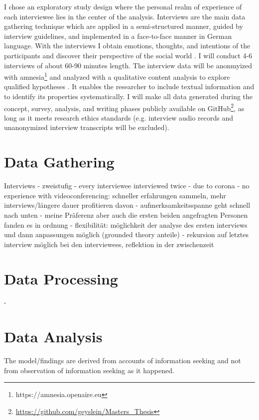 \documentclass[12pt,a4paper,titlepage,oneside,abstract=true,toc=listof,toc=bibliography]{scrreprt}
\begin{document}
I chose an exploratory study design \citep{Rinsdorf2013} where the personal realm of experience of each interviewee lies in the center of the analysis. Interviews are the main data gathering technique which are applied in a semi-structured manner, guided by interview guidelines, and implemented in a face-to-face manner \citep{Bryman2004} in German language. With the interviews I obtain emotions, thoughts, and intentions of the participants and discover their perspective of the social world \citep{Patton2002}. I will conduct 4-6 interviews of about 60-90 minutes length. The interview data will be anonmyized with amnesia\footnote{https://amnesia.openaire.eu} and analyzed with a qualitative content analysis to explore qualified hypotheses \citep{Kohlbacher2006, Krippendorff2012, Mayring2000, Mayring2014}. It enables the researcher to include textual information and to identify its properties systematically. I will make all data generated during the concept, survey, analysis, and writing phases publicly available on GitHub\footnote{\url{https://github.com/geyslein/Masters_Thesis}}, as long as it meets research ethics standards (e.g. interview audio records and unanonymized interview transcripts will be excluded).

\section{Data Gathering}

Interviews - zweistufig
- every interviewee interviewed twice
- due to corona
- no experience with videoconferencing: schneller erfahrungen sammeln, mehr interviews/längere dauer profitieren davon
- aufmerksamkeitsspanne geht schnell nach unten
- meine Präferenz aber auch die ersten beiden angefragten Personen fanden es in ordnung
- flexibilität: möglichkeit der analyse des ersten interviews und dann anpassungen möglich (grounded theory anteile)
- rekursion auf letztes interview möglich bei den interviewees, reflektion in der zwischenzeit 

\section{Data Processing}
- 

\section{Data Analysis}
The model/findings are derived from accounts of information seeking and not from observation of information seeking as it happened.
\end{document}
